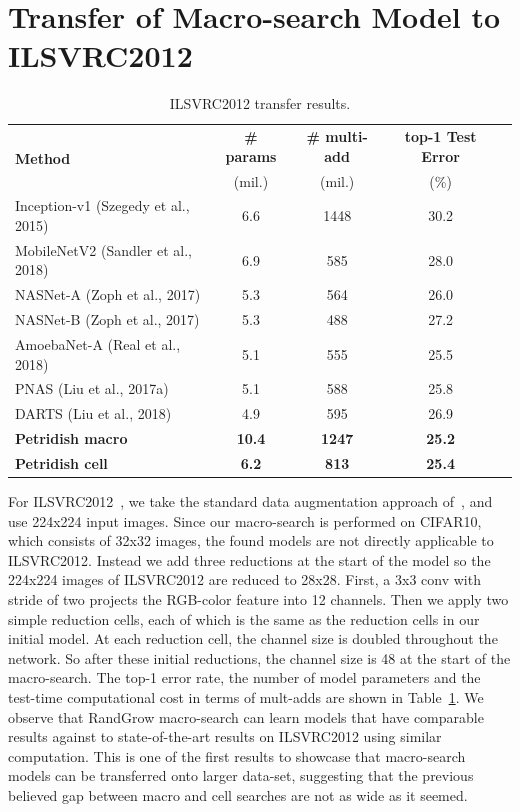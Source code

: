 \documentclass{article}
\newcommand{\Petridish}{Petridish\xspace}
\begin{document}



\newpage
\appendix

\section{Transfer of Macro-search Model to ILSVRC2012}


\begin{table}[t]
    \centering
    \caption{ILSVRC2012 transfer results. 
    }
    \begin{tabular}{l|cccc}
    \hline
\multirow{ 2}{*}{\textbf{Method} }
        &  \textbf{\# params} 
        &  \textbf{\# multi-add}
        &  \textbf{top-1 Test Error } \\
        &  (mil.)
        &  (mil.)
        &  (\%)\\
\hline
Inception-v1 (Szegedy et al., 2015)
    & 6.6 & 1448 & 30.2 \\
MobileNetV2 (Sandler et al., 2018)
    & 6.9 & 585 & 28.0 \\
\hline
NASNet-A (Zoph et al., 2017) 
    & 5.3 & 564 & 26.0 \\
NASNet-B (Zoph et al., 2017) 
    & 5.3 & 488 & 27.2 \\
AmoebaNet-A (Real et al., 2018)
    & 5.1 & 555 & 25.5 \\
PNAS (Liu et al., 2017a)
    & 5.1 & 588 & 25.8 \\
DARTS (Liu et al., 2018)
    & 4.9 & 595 & 26.9 \\
\hline
\textbf{\Petridish macro} 
    & \textbf{10.4} & \textbf{1247} & \textbf{25.2} \\
\hline
\textbf{\Petridish cell}
    & \textbf{6.2} & \textbf{813} & \textbf{25.4} \\
\hline
    \end{tabular}
    \label{tab:imagenet_compare}
\end{table}

For ILSVRC2012~\citep{ILSVRC15}, we take the standard data augmentation approach of~\citep{resnet}, and use 224x224 input images. Since our macro-search is performed on CIFAR10, which consists of 32x32 images, the found models are not directly applicable to ILSVRC2012. Instead we add three reductions at the start of the model so the 224x224 images of ILSVRC2012 are reduced to 28x28. First, a 3x3 conv with stride of two projects the RGB-color feature into 12 channels. Then we apply two simple reduction cells, each of which is the same as the reduction cells in our initial model. At each reduction cell, the channel size is doubled throughout the network. So after these initial reductions, the channel size is 48 at the start of the macro-search. The top-1 error rate, the number of model parameters and the test-time computational cost in terms of mult-adds are shown in Table~\ref{tab:imagenet_compare}. We observe that RandGrow macro-search can learn models that have comparable results against to state-of-the-art results on ILSVRC2012 using similar computation. This is one of the first results to showcase that macro-search models can be transferred onto larger data-set, suggesting that the previous believed gap between macro and cell searches are not as wide as it seemed. 
\end{document}
